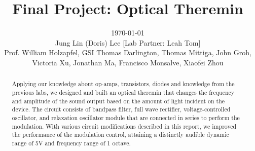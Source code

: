 \documentclass[twocolumn]{article}
\begin{document}
\title{Final Project: Optical Theremin}\vspace{-20pt}
\author{\today \quad \\Jung Lin (Doris) Lee [Lab Partner: Leah Tom]\\Prof. William Holzapfel, GSI Thomas Darlington, Thomas Mittiga, John Groh,  \\Victoria Xu, Jonathan Ma, Francisco Monsalve, Xiaofei Zhou\vspace{-20pt}}	 
\date{}
\maketitle
\begin{abstract}
Applying our knowledge about op-amps, transistors, diodes and knowledge from the previous labs, we designed and built an optical theremin that changes the frequency and amplitude of the sound output based on the amount of light incident on the device. The circuit consists of bandpass filter, full wave rectifier, voltage-controlled oscillator, and relaxation oscillator module that are connected in series to perform the modulation. With various circuit modifications described in this report, we improved the performance of the modulation control, attaining a distinctly audible dynamic range of 5V and frequency range of 1 octave. %
 \end{abstract}
\end{document}
